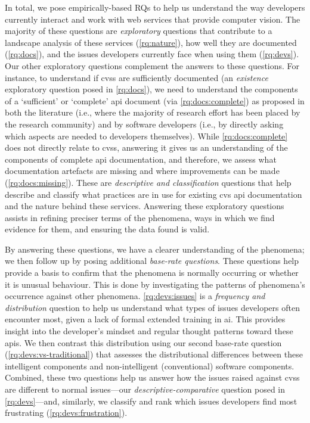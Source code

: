 In total, we pose \NumEmpiricalRQs{} empirically-based RQs to help us understand the way developers currently interact and work with web services that provide computer vision. The majority of these questions are \textit{exploratory} questions that contribute to a landscape analysis of these services (\ref{rq:nature}), how well they are documented (\ref{rq:docs}), and the issues developers currently face when using them (\ref{rq:devs}). Our other exploratory questions complement the answers to these questions. For instance, to understand if \glspl{cvs} are sufficiently documented (an \textit{existence} exploratory question posed in \ref{rq:docs}), we need to understand the components of a `sufficient' or `complete' \gls{api} document (via \ref{rq:docs:complete}) as proposed in both the literature (i.e., where the majority of research effort has been placed by the research community) and by software developers (i.e., by directly asking which aspects are needed to developers themselves). While \ref{rq:docs:complete} does not directly relate to \glspl{cvs}, answering it gives us an understanding of the components of complete \gls{api} documentation, and therefore, we assess what documentation artefacts are missing and where improvements can be made (\ref{rq:docs:missing}). These  are \textit{descriptive and classification} questions that help describe and classify what practices are in use for existing \gls{cvs} \gls{api} documentation and the nature behind these services. Answering these exploratory questions assists in refining preciser terms of the phenomena, ways in which we find evidence for them, and ensuring the data found is valid.

By answering these questions, we have a clearer understanding of the phenomena; we then follow up by posing \NumBaseRateRQs{} additional \textit{base-rate questions}. These questions help provide a basis to confirm that the phenomena is normally occurring or whether it is unusual behaviour. This is done by investigating the patterns of phenomena's occurrence against other phenomena. \ref{rq:devs:issues} is a \textit{frequency and distribution} question to help us understand what types of issues developers often encounter most, given a lack of formal extended training in \gls{ai}. This provides insight into the developer's mindset and regular thought patterns toward these \glspl{api}. We then contrast this distribution using our second base-rate question (\ref{rq:devs:vs-traditional}) that assesses the distributional differences between these intelligent components and non-intelligent (conventional) software components. Combined, these two questions help us answer how the issues raised against \glspl{cvs} are different to normal  issues---our \textit{descriptive-comparative} question posed in \ref{rq:devs}---and, similarly, we classify and rank which issues developers find most frustrating (\ref{rq:devs:frustration}).

